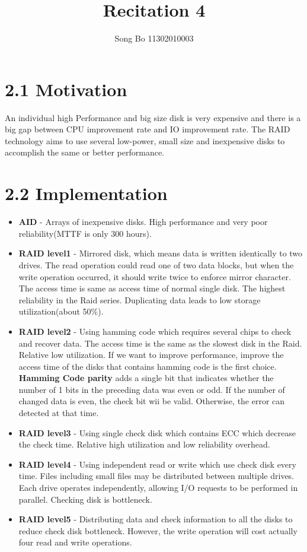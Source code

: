 \documentclass[12pt]{article}
\title{Recitation 4}
\author{Song Bo 11302010003}
\begin{document}
 
  \maketitle 
 \section*{2.1 Motivation}
 An individual high Performance and big size disk is very expensive and there is a big gap between CPU improvement rate and IO improvement rate. The RAID technology aims to use several low-power, small size and inexpensive disks to accomplish the same or better performance.
 \section*{2.2 Implementation}
 \begin{itemize}
 \item \textbf{AID} - Arrays of inexpensive disks. High performance and very poor reliability(MTTF is only 300 hours).
 \item \textbf{RAID level1} - Mirrored disk, which means data is written identically to two drives. The read operation could read one of two data blocks, but when the write operation occurred, it should write twice to enforce mirror character. The access time is same as access time of normal single disk. The highest reliability in the Raid series. Duplicating data leads to low storage utilization(about 50\%).
 \item \textbf{RAID level2} - Using hamming code which requires several chips to check and recover data. The access time is the same as the slowest disk in the Raid. Relative low utilization. If we want to improve performance, improve the access time of the disks that contains hamming code is the first choice.\\[1em]
 \textbf{Hamming Code parity} adds a single bit that indicates whether the number of 1 bits in the preceding data was even or odd. If the number of changed data is even, the check bit wii be valid. Otherwise, the error can detected at that time.
 \item \textbf{RAID level3} - Using single check disk which contains ECC which decrease the check time. Relative high utilization and low reliability overhead.
 \item \textbf{RAID level4} - Using independent read or write which use check disk every time. Files including small files may be distributed between multiple drives. Each drive operates independently, allowing I/O requests to be performed in parallel. Checking disk is bottleneck.
 \item \textbf{RAID level5} - Distributing data and check information to all the disks to reduce check disk bottleneck. However, the write operation will cost actually four read and write operations.
 \end{itemize}
\end{document}
